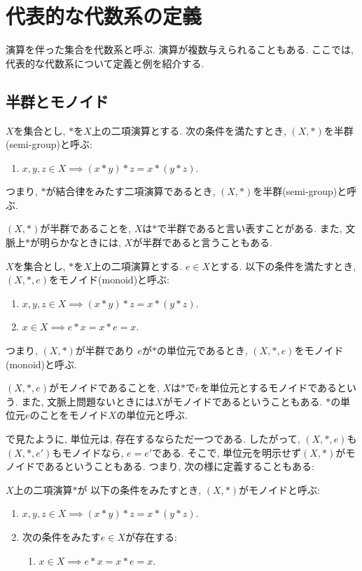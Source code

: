 \chapter{代表的な代数系の定義}
演算を伴った集合を代数系と呼ぶ.
演算が複数与えられることもある.
ここでは,
代表的な代数系について定義と例を紹介する.
\section{半群とモノイド}
\begin{definition}
  $X$を集合とし, $\ast$を$X$上の二項演算とする.
  次の条件を満たすとき, $(X,\ast)$を半群(semi-group)と呼ぶ:
  \begin{enumerate}
    \item $x,y,z\in X \implies (x\ast y)\ast z=x\ast(y\ast z)$.
  \end{enumerate}
  つまり, $\ast$が結合律をみたす二項演算であるとき,
  $(X,\ast)$を半群(semi-group)と呼ぶ.
\end{definition}
\begin{remark}
  $(X,\ast)$が半群であることを,
  $X$は$\ast$で半群であると言い表すことがある.
  また, 文脈上$\ast$が明らかなときには,
  $X$が半群であると言うこともある.
\end{remark}
\begin{definition}
  $X$を集合とし, $\ast$を$X$上の二項演算とする.
  $e\in X$とする.
  以下の条件を満たすとき,
  $(X,\ast,e)$をモノイド(monoid)と呼ぶ:
  \begin{enumerate}
    \item $x,y,z\in X \implies (x\ast y)\ast z=x\ast(y\ast z)$.
    \item $x\in X \implies e\ast x = x\ast e= x$.
  \end{enumerate}
  つまり, $(X,\ast)$が半群であり
  $e$が$\ast$の単位元であるとき,
  $(X,\ast,e)$をモノイド(monoid)と呼ぶ.
\end{definition}
\begin{remark}
  $(X,\ast,e)$がモノイドであることを,
  $X$は$\ast$で$e$を単位元とするモノイドであるという.
  また, 文脈上問題ないときには$X$がモノイドであるということもある.
  $\ast$の単位元$e$のことをモノイド$X$の単位元と呼ぶ.
\end{remark}
で見たように,
単位元は, 存在するならただ一つである.
したがって, 
$(X,\ast,e)$も$(X,\ast,e')$もモノイドなら,
$e=e'$である.
そこで, 
単位元を明示せず$(X,\ast)$がモノイドであるということもある.
つまり, 次の様に定義することもある:
\begin{definition}
  \label{def:monoid:alt}
 $X$上の二項演算$\ast$が
  以下の条件をみたすとき,
  $(X,\ast)$がモノイドと呼ぶ:
  \begin{enumerate}
    \item $x,y,z\in X \implies (x\ast y)\ast z=x\ast(y\ast z)$.
    \item 次の条件をみたす$e\in X$が存在する:
      \begin{enumerate}
        \item
        $x\in X \implies e\ast x = x\ast e= x$.
      \end{enumerate}
  \end{enumerate}
\end{definition}

